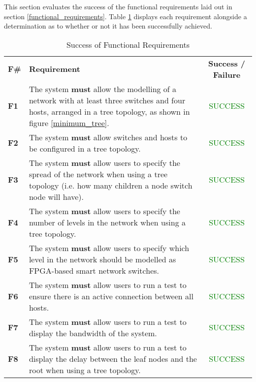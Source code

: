 
This section evaluates the success of the functional requirements laid out in section \ref{functional_requirements}. Table \ref{evaluation_functional_requirements_table} displays each requirement alongside a determination as to whether or not it has been successfully achieved.

\begin{center}
  \begin{longtable}{|l|p{9cm}|c|}
    \caption{Success of Functional Requirements} \\ \hline
    \label{evaluation_functional_requirements_table}
    \textbf{F\#} & \textbf{Requirement} & \textbf{Success / Failure} \\ \thickhline
    \textbf{F1} & The system \textbf{must} allow the modelling of a network with at least three switches and four hosts, arranged in a tree topology, as shown in figure \ref{minimum_tree}. & \textcolor{green}{SUCCESS} \\ \hline
    \textbf{F2} & The system \textbf{must} allow switches and hosts to be configured in a tree topology. & \textcolor{green}{SUCCESS} \\ \hline
    \textbf{F3} & The system \textbf{must} allow users to specify the spread of the network when using a tree topology (i.e. how many children a node switch node will have). & \textcolor{green}{SUCCESS} \\ \hline
    \textbf{F4} & The system \textbf{must} allow users to specify the number of levels in the network when using a tree topology. & \textcolor{green}{SUCCESS} \\ \hline
    \textbf{F5} & The system \textbf{must} allow users to specify which level in the network should be modelled as FPGA-based smart network switches. & \textcolor{green}{SUCCESS} \\ \hline
    \textbf{F6} & The system \textbf{must} allow users to run a test to ensure there is an active connection between all hosts. & \textcolor{green}{SUCCESS} \\ \hline
    \textbf{F7} & The system \textbf{must} allow users to run a test to display the bandwidth of the system. & \textcolor{green}{SUCCESS} \\ \hline
    \textbf{F8} & The system \textbf{must} allow users to run a test to display the delay between the leaf nodes and the root when using a tree topology. & \textcolor{green}{SUCCESS} \\ \hline

\end{longtable}
\end{center}
